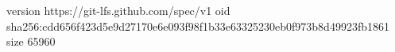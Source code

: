 version https://git-lfs.github.com/spec/v1
oid sha256:cdd656f423d5e9d27170e6e093f98f1b33e63325230eb0f973b8d49923fb1861
size 65960
